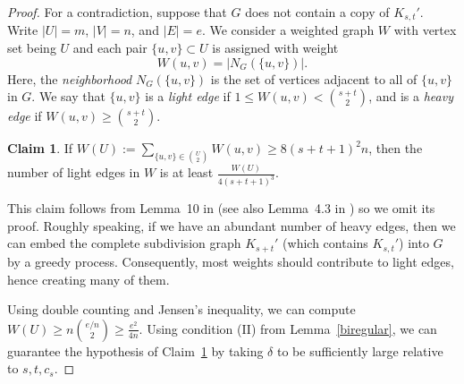 \documentclass[11pt]{article}
\theoremstyle{definition}
\newtheorem{claim}[theorem]{Claim}
\begin{document}
\begin{proof}

    For a contradiction, suppose that $G$ does not contain a copy of $K_{s,t}'$. Write $|U| = m$, $|V| = n$, and $|E| = e$. We consider a weighted graph $W$ with vertex set being $U$ and each pair $\{u,v\} \subset U$ is assigned with weight \begin{equation*}
        W(u,v) = |N_G(\{u,v\})|.
    \end{equation*} Here, the \textit{neighborhood} $N_G(\{u,v\})$ is the set of vertices adjacent to all of $\{u,v\}$ in $G$. We say that $\{u,v\}$ is a \textit{light edge} if $1\leq W(u,v) < \binom{s+t}{2}$, and is a \textit{heavy edge} if $W(u,v) \geq \binom{s+t}{2}$.
    \begin{claim}\label{cjl_43}
        If $W(U) := \sum_{\{u,v\} \in \binom{U}{2}} W(u,v) \geq 8(s+t+1)^2n$, then the number of light edges in $W$ is at least $\frac{W(U)}{4(s+t+1)^3}$.
    \end{claim}
    \noindent This claim follows from Lemma~10 in \cite{janzer2019improved} (see also Lemma~4.3 in \cite{conlon2021more}) so we omit its proof. Roughly speaking, if we have an abundant number of heavy edges, then we can embed the complete subdivision graph $K_{s+t}'$ (which contains $K_{s,t}'$) into $G$ by a greedy process. Consequently, most weights should contribute to light edges, hence creating many of them.
    
    Using double counting and Jensen's inequality, we can compute $W(U) \geq n\binom{e/n}{2}\geq \frac{e^2}{4n}$. Using condition (II) from Lemma~\ref{biregular}, we can guarantee the hypothesis of Claim~\ref{cjl_43} by taking $\delta$ to be sufficiently large relative to $s,t,c_s$.


\end{proof}
\end{document}
